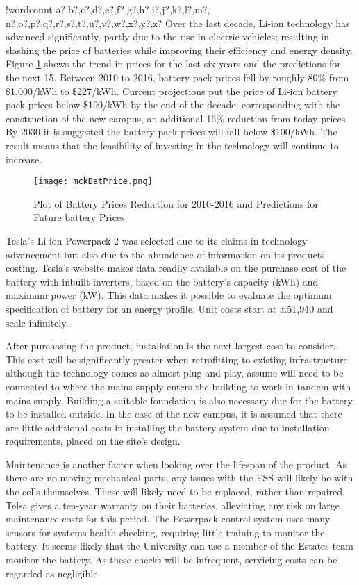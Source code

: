 \documentclass[fontsize=9.5pt]{extarticle}
\numberwithin{figure}{section} %
\newcounter{words}
\newenvironment{counted}{%
  \setcounter{words}{0}
  \SearchList!{wordcount}{\stepcounter{words}}
    {a?,b?,c?,d?,e?,f?,g?,h?,i?,j?,k?,l?,m?,
    n?,o?,p?,q?,r?,s?,t?,u?,v?,w?,x?,y?,z?}
  \UndoBoundary{'}
  \SearchOrder{p;}}{%
  \StopSearching}
\begin{document}
\begin{counted}
Over the last decade, Li-ion technology has advanced significantly,
partly due to the rise in electric vehicles; resulting in slashing the
price of batteries while improving their efficiency and energy density.
Figure \ref{mckBatPrice} shows the trend in prices for the last six
years and the predictions for the next 15. Between 2010 to 2016, battery
pack prices fell by roughly 80\% from \$1,000/kWh to \$227/kWh. Current
projections put the price of Li-ion battery pack prices below \$190/kWh
by the end of the decade, corresponding with the construction of the new
campus, an additional 16\% reduction from today prices. By 2030 it is
suggested the battery pack prices will fall below \$100/kWh. The result
means that the feasibility of investing in the technology will continue
to increase.

\begin{figure}[H]
  \centering
  \texttt{[image: mckBatPrice.png]}
  \caption{Plot of Battery Prices Reduction for 2010-2016 and Predictions for Future battery Prices \cite{mckBat}}
  \label{mckBatPrice}
\end{figure}

Tesla's Li-ion Powerpack 2 was selected due to its claims in technology
advancement but also due to the abundance of information on its products
costing. Tesla's website makes data readily available on the purchase
cost of the battery with inbuilt inverters, based on the battery's
capacity (kWh) and maximum power (kW). This data makes it possible to
evaluate the optimum specification of battery for an energy profile.
Unit costs start at £51,940 and scale infinitely.

After purchasing the product, installation is the next largest cost to
consider. This cost will be significantly greater when retrofitting to
existing infrastructure although the technology comes as almost plug and
play, assume will need to be connected to where the mains supply enters
the building to work in tandem with mains supply. Building a suitable
foundation is also necessary due for the battery to be installed
outside. In the case of the new campus, it is assumed that there are
little additional costs in installing the battery system due to
installation requirements, placed on the site's design.

Maintenance is another factor when looking over the lifespan of the
product. As there are no moving mechanical parts, any issues with the
ESS will likely be with the cells themselves. These will likely need to
be replaced, rather than repaired. Telsa gives a ten-year warranty on
their batteries, alleviating any risk on large maintenance costs for
this period. The Powerpack control system uses many sensors for systems
health checking, requiring little training to monitor the battery. It
seems likely that the University can use a member of the Estates team
monitor the battery. As these checks will be infrequent, servicing costs
can be regarded as negligible.


\end{counted}
\end{document}

